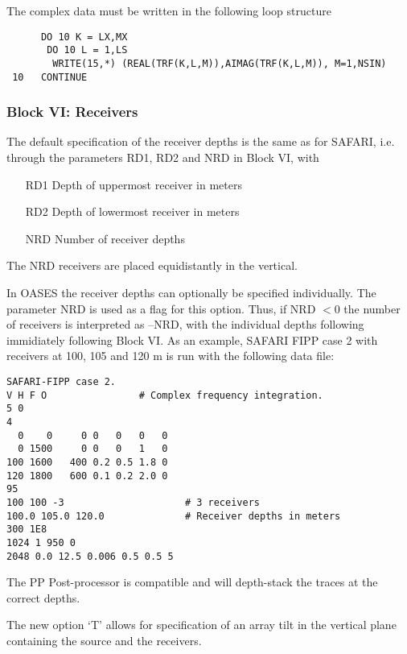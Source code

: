 \noindent The complex data must be written in the following loop structure

\small
\begin{verbatim}
      DO 10 K = LX,MX
       DO 10 L = 1,LS
        WRITE(15,*) (REAL(TRF(K,L,M)),AIMAG(TRF(K,L,M)), M=1,NSIN)
 10   CONTINUE
\end{verbatim}
\normalsize

\subsubsection{Block VI: Receivers}

The default specification of the receiver depths is the same as for
SAFARI, i.e. through the parameters RD1, RD2 and NRD in Block VI, with
\begin{itemize}
\item[RD1]  Depth of uppermost receiver in meters
\item[RD2]  Depth of lowermost receiver in meters
\item[NRD]   Number of receiver depths 
\end{itemize}

The NRD receivers are placed equidistantly in the vertical.


In OASES the receiver depths can optionally be specified individually.
The parameter NRD is used as a flag for this option. Thus, if NRD $< 0$
the number of receivers is interpreted as --NRD, with the individual
depths following immidiately following Block VI. As an example, SAFARI
FIPP case 2 with receivers at 100, 105 and 120 m is run with the
following data file: 

\small
\begin{verbatim}
SAFARI-FIPP case 2.
V H F O			       # Complex frequency integration. 
5 0
4
  0    0     0 0   0   0   0
  0 1500     0 0   0   1   0
100 1600   400 0.2 0.5 1.8 0
120 1800   600 0.1 0.2 2.0 0
95
100 100 -3                     # 3 receivers
100.0 105.0 120.0              # Receiver depths in meters
300 1E8                      
1024 1 950 0
2048 0.0 12.5 0.006 0.5 0.5 5
\end{verbatim}
\normalsize 

The PP Post-processor is compatible and will depth-stack the traces at
the correct depths.


The new option `T' allows for specification of an array tilt in the
vertical plane containing the source and the receivers.

